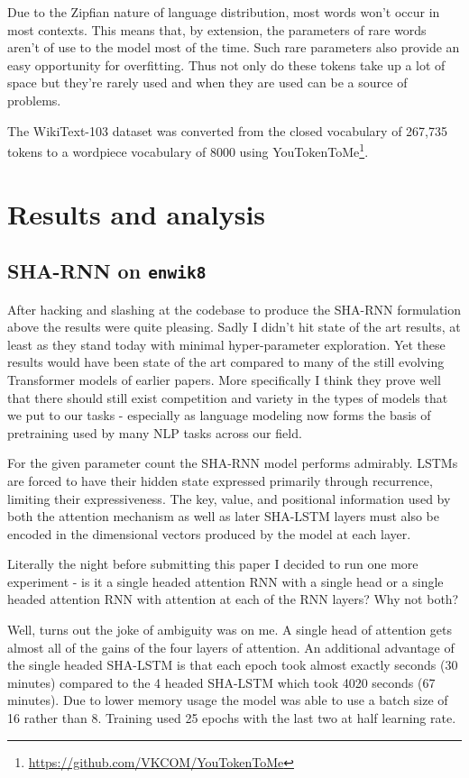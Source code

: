 \documentclass{article}
\newcommand{\enwik}{\texttt{enwik8}\xspace}
\begin{document}
Due to the Zipfian nature of language distribution, most words won't occur in most contexts.
This means that, by extension, the parameters of rare words aren't of use to the model most of the time.
Such rare parameters also provide an easy opportunity for overfitting.
Thus not only do these tokens take up a lot of space but they're rarely used and when they are used can be a source of problems.



The WikiText-103 dataset was converted from the closed vocabulary of 267,735 tokens to a wordpiece vocabulary of 8000 using YouTokenToMe\footnote{\url{https://github.com/VKCOM/YouTokenToMe}}.


\section{Results and analysis}

\subsection{SHA-RNN on \enwik}

After hacking and slashing at the codebase to produce the SHA-RNN formulation above the results were quite pleasing.
Sadly I didn't hit state of the art results, at least as they stand today with minimal hyper-parameter exploration.
Yet these results would have been state of the art compared to many of the still evolving Transformer models of earlier papers.
More specifically I think they prove well that there should still exist competition and variety in the types of models that we put to our tasks - especially as language modeling now forms the basis of pretraining used by many NLP tasks across our field.

For the given parameter count the SHA-RNN model performs admirably.
LSTMs are forced to have their hidden state expressed primarily through recurrence, limiting their expressiveness.
The key, value, and positional information used by both the attention mechanism as well as later SHA-LSTM layers must also be encoded in the  dimensional vectors produced by the model at each layer.


Literally the night before submitting this paper I decided to run one more experiment - is it a single headed attention RNN with a single head or a single headed attention RNN with attention at each of the RNN layers?
Why not both?

Well, turns out the joke of ambiguity was on me.
A single head of attention gets almost all of the gains of the four layers of attention.
An additional advantage of the single headed SHA-LSTM is that each epoch took almost exactly  seconds (30 minutes) compared to the 4 headed SHA-LSTM which took 4020 seconds (67 minutes).
Due to lower memory usage the model was able to use a batch size of 16 rather than 8.
Training used 25 epochs with the last two at half learning rate.
\end{document}

